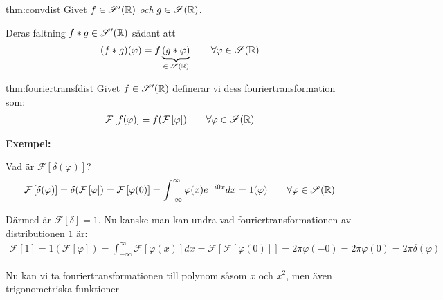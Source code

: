 \par\bigskip
\begin{theo}{thm:convdist}
  Givet $f\in\mathscr{S}^{\prime}(\mathbb{R})$ \textit{och} $g\in\mathscr{S}(\mathbb{R})$.\par
  \noindent Deras faltning $f*g\in\mathscr{S}^{\prime}(\mathbb{R})$ sådant att
  \begin{equation*}
    \begin{gathered}
      (f*g)(\varphi) = f\underbrace{(g*\varphi)}_{\text{$\in\mathscr{S}(\mathbb{R})$}}\qquad\forall\varphi\in\mathscr{S}(\mathbb{R})
    \end{gathered}
  \end{equation*}
\end{theo}
\par\bigskip
\begin{theo}{thm:fouriertransfdist}
  Givet $f\in\mathscr{S}^{\prime}(\mathbb{R})$ definerar vi dess fouriertransformation som:
  \begin{equation*}
    \begin{gathered}
      \mathcal{F}\left[f(\varphi)\right] = f(\mathcal{F}\left[\varphi\right])\qquad\forall\varphi\in\mathscr{S}(\mathbb{R})
    \end{gathered}
  \end{equation*}
\end{theo}
\par\bigskip
\noindent\textbf{Exempel:}\par
\noindent Vad är $\mathcal{F}\left[\delta(\varphi)\right]$?
\begin{equation*}
  \begin{gathered}
    \mathcal{F}\left[\delta(\varphi)\right] = \delta(\mathcal{F}\left[\varphi\right]) = \mathcal{F}\left[\varphi(0)\right] = \int_{-\infty}^{\infty}\varphi(x)e^{-i0x}dx = 1(\varphi)\qquad\forall \varphi\in\mathscr{S}(\mathbb{R})
  \end{gathered}
\end{equation*}
\par\bigskip
\noindent Därmed är $\mathcal{F}\left[\delta\right]=1$. Nu kanske man kan undra vad fouriertransformationen av distributionen $1$ är:
\begin{equation*}
  \begin{gathered}
    \mathcal{F}\left[1\right] = 1(\mathcal{F}\left[\varphi\right]) = \int_{-\infty}^{\infty}\mathcal{F}\left[\varphi(x)\right]dx =\mathcal{F}\left[\mathcal{F}\left[\varphi(0)\right]\right] = 2\pi\varphi(-0) = 2\pi\varphi(0) = 2\pi\delta(\varphi)
  \end{gathered}
\end{equation*}
\par\bigskip
\noindent Nu kan vi ta fouriertransformationen till polynom såsom $x$ och $x^2$, men även trigonometriska funktioner
\newpage
